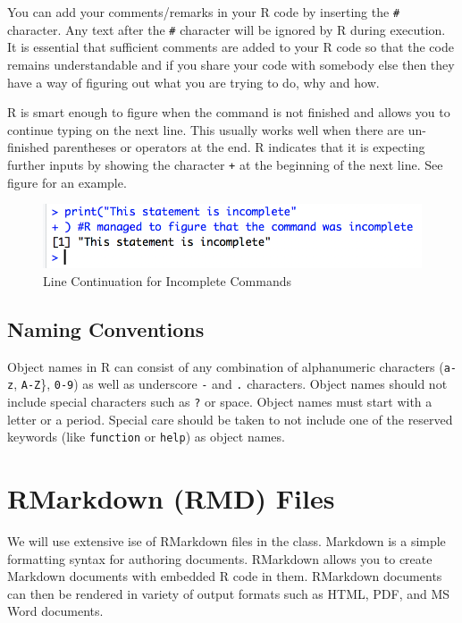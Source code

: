 \documentclass[]{krantz}
\theoremstyle{definition}
\theoremstyle{definition}
\theoremstyle{definition}
\theoremstyle{remark}
\begin{document}
You can add your comments/remarks in your R code by inserting the
\texttt{\#} character. Any text after the \texttt{\#} character will be
ignored by R during execution. It is essential that sufficient comments
are added to your R code so that the code remains understandable and if
you share your code with somebody else then they have a way of figuring
out what you are trying to do, why and how.

R is smart enough to figure when the command is not finished and allows
you to continue typing on the next line. This usually works well when
there are un-finished parentheses or operators at the end. R indicates
that it is expecting further inputs by showing the character \texttt{+}
at the beginning of the next line. See figure for an example.

\begin{figure}

{\centering \includegraphics[width=0.5\linewidth]{images/incomplete} 

}

\caption{Line Continuation for Incomplete Commands}\label{fig:unnamed-chunk-10}
\end{figure}

\subsection{Naming Conventions}\label{naming-conventions}

Object names in R can consist of any combination of alphanumeric
characters (\texttt{a-z}, \texttt{A-Z}\}, \texttt{0-9}) as well as
underscore \texttt{-} and \texttt{.} characters. Object names should not
include special characters such as \texttt{?} or space. Object names
must start with a letter or a period. Special care should be taken to
not include one of the reserved keywords (like \texttt{function} or
\texttt{help}) as object names.

\section{RMarkdown (RMD) Files}\label{rmarkdown-rmd-files}

We will use extensive ise of RMarkdown files in the class. Markdown is a
simple formatting syntax for authoring documents. RMarkdown allows you
to create Markdown documents with embedded R code in them. RMarkdown
documents can then be rendered in variety of output formats such as
HTML, PDF, and MS Word documents.
\end{document}
